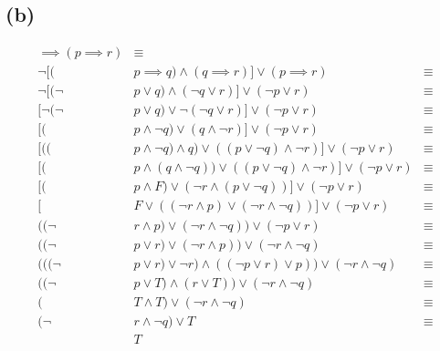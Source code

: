 \documentclass{article}
\begin{document}
\subsection{(b)}
\begin{align*}
	[(          & p \implies q) \land (q \implies r)] \implies (p \implies r)                         & \equiv \\
	\neg [(     & p \implies q) \land (q \implies r)] \lor (p \implies r)                             & \equiv \\
	\neg [(\neg & p \lor q) \land (\neg q \lor r)] \lor (\neg p \lor r)                               & \equiv \\
	[\neg(\neg  & p \lor q) \lor \neg (\neg q \lor r)] \lor (\neg p \lor r)                           & \equiv \\
	[(          & p \land \neg q) \lor (q \land \neg r)] \lor (\neg p \lor r)                         & \equiv \\
	[((         & p \land \neg q) \land q) \lor ((p \lor \neg q) \land \neg r)] \lor (\neg p \lor r)  & \equiv \\
	[(          & p \land (q \land \neg q)) \lor ((p \lor \neg q) \land \neg r)] \lor (\neg p \lor r) & \equiv \\
	[(          & p \land F) \lor (\neg r \land (p \lor \neg q))] \lor (\neg p \lor r)                & \equiv \\
	[           & F \lor ((\neg r \land p) \lor (\neg r \land \neg q))] \lor (\neg p \lor r)          & \equiv \\
	((\neg      & r \land p) \lor (\neg r \land \neg q)) \lor (\neg p \lor r)                         & \equiv \\
	((\neg      & p \lor r) \lor (\neg r \land p)) \lor (\neg r \land \neg q)                         & \equiv \\
	(((\neg     & p \lor r) \lor \neg r) \land ((\neg p \lor r) \lor p)) \lor (\neg r \land \neg q)   & \equiv \\
	((\neg      & p \lor T) \land (r \lor T)) \lor (\neg r \land \neg q)                              & \equiv \\
	(           & T \land T) \lor (\neg r \land \neg q)                                               & \equiv \\
	(\neg       & r \land \neg q) \lor T                                                              & \equiv \\
	            & T
\end{align*}
\end{document}
